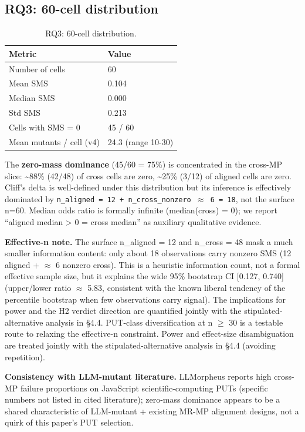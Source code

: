 \documentclass[manuscript,screen,review]{acmart}
\begin{document}
\subsection{RQ3: 60-cell distribution}\label{rq1-60-cell-distribution}

{%
\begin{longtable}[]{@{}ll@{}}
\caption{RQ3: 60-cell distribution.}\label{tab:p2-08}\\
\toprule\noalign{}
Metric & Value \\
\midrule\noalign{}
\endhead
\bottomrule\noalign{}
\endlastfoot
Number of cells & 60 \\
Mean SMS & 0.104 \\
Median SMS & 0.000 \\
Std SMS & 0.213 \\
Cells with SMS = 0 & 45 / 60 \\
Mean mutants / cell (v4) & 24.3 (range 10-30) \\
\end{longtable}
}

The \textbf{zero-mass dominance} (45/60 = 75\%) is concentrated in the
cross-MP slice: \textasciitilde88\% (42/48) of cross cells are zero,
\textasciitilde25\% (3/12) of aligned cells are zero. Cliff's delta is
well-defined under this distribution but its inference is effectively
dominated by
\texttt{n\_aligned\ =\ 12\ +\ n\_cross\_nonzero\ $\approx$\ 6\ =\ 18}, not the
surface n=60. Median odds ratio is formally infinite (median(cross) =
0); we report ``aligned median \textgreater{} 0 = cross median'' as
auxiliary qualitative evidence.

\textbf{Effective-n note.} The surface n\_aligned = 12 and n\_cross = 48
mask a much smaller information content: only about 18 observations carry
nonzero SMS (12 aligned + $\approx$ 6 nonzero cross). This is a heuristic
information count, not a formal effective sample size, but it explains the
wide 95\% bootstrap CI {[}0.127, 0.740{]} (upper/lower ratio $\approx$
5.83, consistent with the known liberal tendency of the percentile
bootstrap when few observations carry signal). The implications for power and the H2 verdict direction are
quantified jointly with the stipulated-alternative analysis in §4.4.
PUT-class diversification at n $\geq$ 30 is a testable route to relaxing
the effective-n constraint. Power and effect-size disambiguation are
treated jointly with the stipulated-alternative analysis in §4.4
(avoiding repetition).

\textbf{Consistency with LLM-mutant literature.} \citet{tip2025llmorpheus}
LLMorpheus reports high cross-MP failure proportions on JavaScript
scientific-computing PUTs (specific numbers not listed in cited
literature); zero-mass dominance appears to be a shared characteristic
of LLM-mutant + existing MR-MP alignment designs, not a quirk of this
paper's PUT selection.
\end{document}
